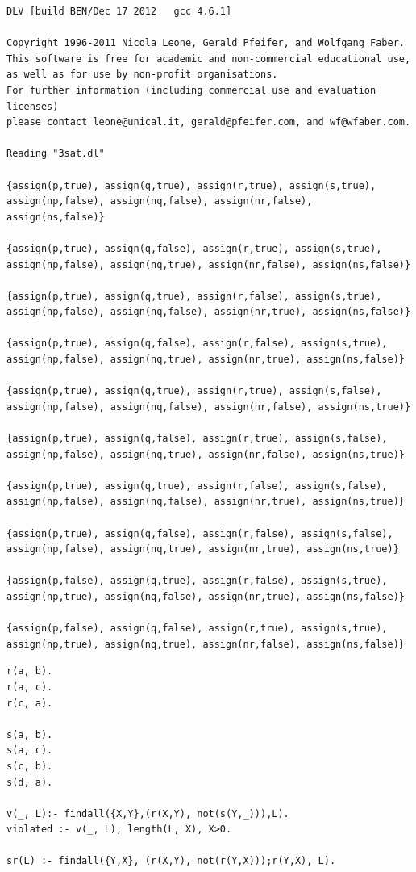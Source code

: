 \documentclass[12pt,fullpage]{article}
\begin{document}
\newpage
{}
\begin{verbatim}
DLV [build BEN/Dec 17 2012   gcc 4.6.1]

Copyright 1996-2011 Nicola Leone, Gerald Pfeifer, and Wolfgang Faber.
This software is free for academic and non-commercial educational use,
as well as for use by non-profit organisations.
For further information (including commercial use and evaluation licenses)
please contact leone@unical.it, gerald@pfeifer.com, and wf@wfaber.com.

Reading "3sat.dl"

{assign(p,true), assign(q,true), assign(r,true), assign(s,true),
assign(np,false), assign(nq,false), assign(nr,false), assign(ns,false)}

{assign(p,true), assign(q,false), assign(r,true), assign(s,true),
assign(np,false), assign(nq,true), assign(nr,false), assign(ns,false)}

{assign(p,true), assign(q,true), assign(r,false), assign(s,true),
assign(np,false), assign(nq,false), assign(nr,true), assign(ns,false)}

{assign(p,true), assign(q,false), assign(r,false), assign(s,true),
assign(np,false), assign(nq,true), assign(nr,true), assign(ns,false)}

{assign(p,true), assign(q,true), assign(r,true), assign(s,false),
assign(np,false), assign(nq,false), assign(nr,false), assign(ns,true)}

{assign(p,true), assign(q,false), assign(r,true), assign(s,false),
assign(np,false), assign(nq,true), assign(nr,false), assign(ns,true)}

{assign(p,true), assign(q,true), assign(r,false), assign(s,false),
assign(np,false), assign(nq,false), assign(nr,true), assign(ns,true)}

{assign(p,true), assign(q,false), assign(r,false), assign(s,false),
assign(np,false), assign(nq,true), assign(nr,true), assign(ns,true)}

{assign(p,false), assign(q,true), assign(r,false), assign(s,true),
assign(np,true), assign(nq,false), assign(nr,true), assign(ns,false)}

{assign(p,false), assign(q,false), assign(r,true), assign(s,true),
assign(np,true), assign(nq,true), assign(nr,false), assign(ns,false)}

\end{verbatim}
\newpage
{}
\begin{verbatim}
r(a, b).
r(a, c).
r(c, a).

s(a, b).
s(a, c).
s(c, b).
s(d, a).

v(_, L):- findall({X,Y},(r(X,Y), not(s(Y,_))),L).
violated :- v(_, L), length(L, X), X>0.

sr(L) :- findall({Y,X}, (r(X,Y), not(r(Y,X)));r(Y,X), L).
\end{verbatim}
\end{document}
